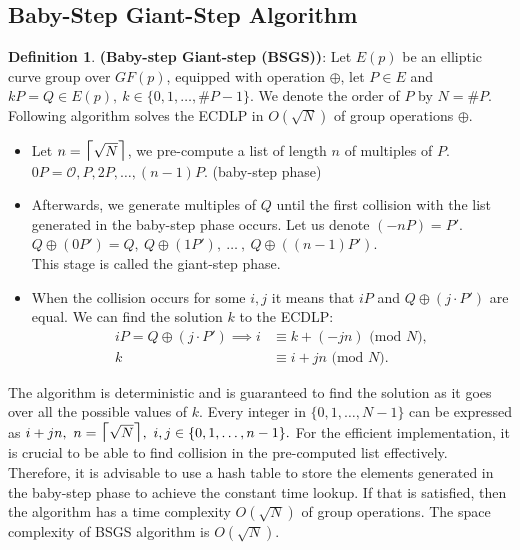 \documentclass[thesis=M,english]{FITthesis}[2012/10/20]
\theoremstyle{remark}
\theoremstyle{definition}
\newtheorem{DF}{Definition}[section]
\begin{document}
\subsection{Baby-Step Giant-Step Algorithm}
\begin{DF}
\textbf{(Baby-step Giant-step (BSGS))}: Let $E(p)$ be an elliptic curve group over $GF(p)$, equipped with operation $\oplus$, let $P \in E$ and $kP = Q \in E(p),\ k \in \{0, 1, \ldots, \#P - 1\}$. We denote the order of $P$ by $N = \#P$. Following algorithm solves the ECDLP in $O(\sqrt{N})$ of group operations $\oplus$.
\begin{itemize}
\item Let $n = \mathlarger{\mathlarger{\mathlarger{\lceil}}} \sqrt{N} \mathlarger{\mathlarger{\mathlarger{\rceil}}}$, we pre-compute a list of length $n$ of multiples of $P$. \\
$0P = \mathcal{O}, P, 2P, \ldots, (n-1)P.$ \hfill (baby-step phase) \\
\item Afterwards, we generate multiples of $Q$ until the first collision with the list generated in the baby-step phase occurs. Let us denote $(-n P) = P'$. \\
$Q \oplus (0P') = Q,\ Q \oplus (1P'),\ \ldots\ ,\ Q \oplus ((n-1)P').$\\
This stage is called the giant-step phase.
\item When the collision occurs for some $i,j$ it means that $iP$ and $Q \oplus (j\cdot P')$ are equal. We can find the solution $k$ to the ECDLP:
\begin{align*}
iP = Q \oplus (j\cdot P') \implies i &\equiv k + (-jn) \text{ (mod $N$)}, \\
k &\equiv i + jn \text{ (mod $N$)}.
\end{align*}
\end{itemize}
\noindent The algorithm is deterministic and is guaranteed to find the solution as it goes over all the possible values of $k$. Every integer in $\{0, 1, \ldots, N - 1\}$ can be expressed as $i + jn,\ n = \mathlarger{\mathlarger{\mathlarger{\lceil}}} \sqrt{N} \mathlarger{\mathlarger{\mathlarger{\rceil}}},\ i,j \in \{0,1,\ldots, n-1\}.$ 
For the efficient implementation, it is crucial to be able to find collision in the pre-computed list effectively. Therefore, it is advisable to use a hash table to store the elements generated in the baby-step phase to achieve the constant time lookup. If that is satisfied, then the algorithm has a time complexity $O(\sqrt{N})$ of group operations. The space complexity of BSGS algorithm is $O(\sqrt{N})$.
\end{DF}
\end{document}
